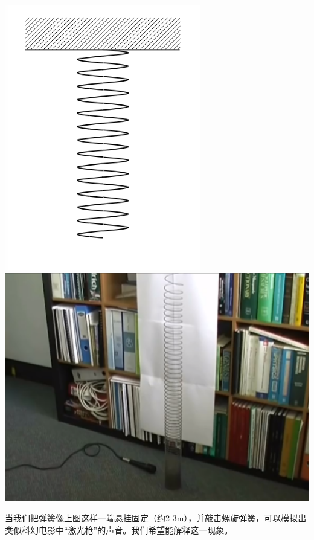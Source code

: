 \documentclass[UTF8,9pt]{report}
\begin{document}
\begin{center}
    \includegraphics[scale=0.7]{1_1.png}
    \includegraphics[scale=0.2]{1_12.png}
\end{center}
当我们把弹簧像上图这样一端悬挂固定（约2-3m），并敲击螺旋弹簧，可以模拟出类似科幻电影中“激光枪”的声音。我们希望能解释这一现象。
\end{document}
